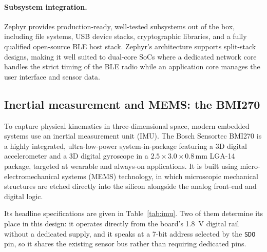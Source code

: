 \documentclass[12pt, a4paper]{article}
\begin{document}
\paragraph{Subsystem integration.}
Zephyr provides production-ready, well-tested subsystems out of the box,
including file systems, USB device stacks, cryptographic libraries, and a fully
qualified open-source BLE host stack. Zephyr's architecture supports split-stack
designs, making it well suited to dual-core SoCs where a dedicated network core
handles the strict timing of the BLE radio while an application core manages the
user interface and sensor data.

\subsection{Inertial measurement and MEMS: the BMI270}
\label{comp:bmi270}
To capture physical kinematics in three-dimensional space, modern embedded
systems use an inertial measurement unit (IMU). The Bosch Sensortec BMI270 is a
highly integrated, ultra-low-power system-in-package featuring a 3D digital
accelerometer and a 3D digital gyroscope in a
$2.5\times3.0\times0.8\,\text{mm}$ LGA-14 package, targeted at wearable and
always-on applications. It is built using
micro-electromechanical systems (MEMS) technology, in which microscopic
mechanical structures are etched directly into the silicon alongside the analog
front-end and digital logic.

Its headline specifications are given in Table~\ref{tab:imu}. Two of them
determine its place in this design: it operates directly from the board's
\SI{1.8}{\volt} digital rail without a dedicated supply, and it speaks
 at a 7-bit address selected by the \texttt{SDO} pin, so it shares the
existing sensor bus rather than requiring dedicated pins.
\end{document}
